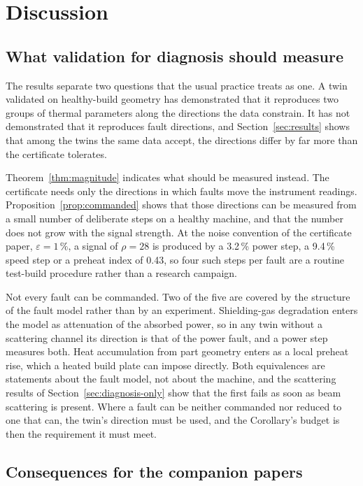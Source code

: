 \documentclass[preprint,12pt]{elsarticle}
\begin{document}
\section{Discussion}
\label{sec:discussion}

\subsection{What validation for diagnosis should measure}

The results separate two questions that the usual practice treats as one. A twin
validated on healthy-build geometry has demonstrated that it reproduces two
groups of thermal parameters along the directions the data constrain. It has
not demonstrated that it reproduces fault directions, and
Section~\ref{sec:results} shows that among the twins the same data accept, the
directions differ by far more than the certificate tolerates.

Theorem~\ref{thm:magnitude} indicates what should be measured instead. The
certificate needs only the directions in which faults move the instrument
readings. Proposition~\ref{prop:commanded} shows that those directions can be
measured from a small number of deliberate steps on a healthy machine, and that
the number does not grow with the signal strength. At the noise convention of
the certificate paper, $\varepsilon = 1\,\%$, a signal of $\rho = 28$ is
produced by a 3.2\,\% power step, a 9.4\,\% speed step or a
preheat index of 0.43, so four such steps per fault are a routine
test-build procedure rather than a research campaign.

Not every fault can be commanded. Two of the five are covered by the structure
of the fault model rather than by an experiment. Shielding-gas degradation
enters the model as attenuation of the absorbed power, so in any twin without a
scattering channel its direction is that of the power fault, and a power step
measures both. Heat accumulation from part geometry enters as a local preheat
rise, which a heated build plate can impose directly. Both equivalences are
statements about the fault model, not about the machine, and the scattering
results of Section~\ref{sec:diagnosis-only} show that the first fails as soon as
beam scattering is present. Where a fault can be neither commanded nor reduced
to one that can, the twin's direction must be used, and the Corollary's budget
is then the requirement it must meet.

\subsection{Consequences for the companion papers}
\end{document}
